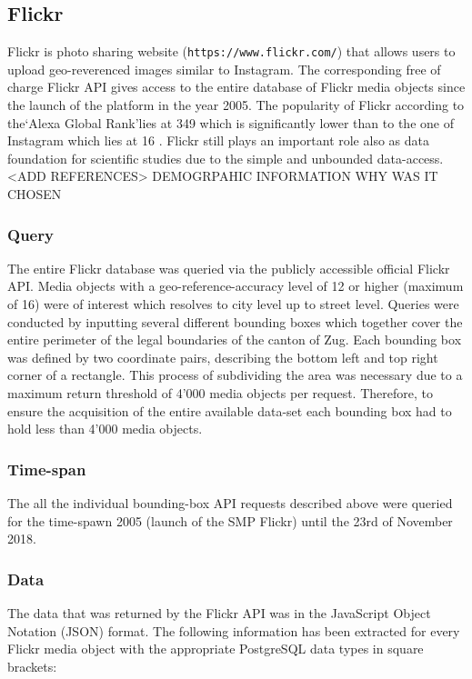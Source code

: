 \subsection{Flickr} \label{flickr}
Flickr is photo sharing website (\texttt{https://www.flickr.com/}) that allows users to upload geo-reverenced images similar to Instagram. The corresponding free of charge Flickr API gives access to the entire database of Flickr media objects since the launch of the platform in the year 2005. The popularity of Flickr according to the\lq Alexa Global Rank\rq lies at 349 \cite{Alexa.com2019AlexaFlickr} which is significantly lower than to the one of Instagram which lies at 16 \cite{Alexa.com2019AlexaInstagram}. Flickr still plays an important role also as data foundation for scientific studies due to the simple and unbounded data-access. <ADD REFERENCES>
DEMOGRPAHIC INFORMATION
WHY WAS IT CHOSEN
\subsubsection{Query} \label{flickr_query}
The entire Flickr database was queried via the publicly accessible official Flickr API. Media objects with a geo-reference-accuracy level of 12 or higher (maximum of 16) were of interest which resolves to city level up to street level. Queries were conducted by inputting several different bounding boxes which together cover the entire perimeter of the legal boundaries of the canton of Zug. Each bounding box was defined by two coordinate pairs, describing the bottom left and top right corner of a rectangle. This process of subdividing the area was necessary due to a maximum return threshold of 4\rq000 media objects per request. Therefore, to ensure the acquisition of the entire available data-set each bounding box had to hold less than 4\rq000 media objects.
\subsubsection{Time-span} \label{flickr_timespan}
The all the individual bounding-box API requests described above were queried for the time-spawn 2005 (launch of the SMP Flickr) until the 23rd of November 2018. 
\subsubsection{Data} \label{flickr_data}
The data that was returned by the Flickr API was in the JavaScript Object Notation (JSON) format. The following information has been extracted for every Flickr media object with the appropriate PostgreSQL data types in square brackets:\\

